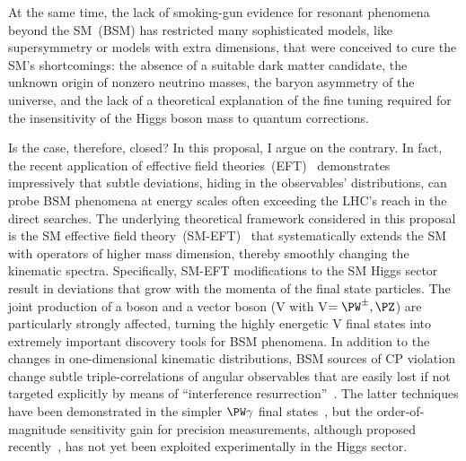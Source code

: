 \documentclass[a4paper,11pt]{article}
\renewcommand{\PV}{{{{V}}}\xspace}
\newcommand{\VH}{{{\PV}{\PH}}\xspace}
\begin{document}
At the same time, the lack of smoking-gun evidence for resonant phenomena beyond the SM~(BSM) has restricted many sophisticated models, like supersymmetry or models with extra dimensions, that were conceived to cure the SM's shortcomings: 
the absence of a suitable dark matter candidate, the unknown origin of nonzero neutrino masses, the baryon asymmetry of the universe, and the lack of a theoretical explanation of the fine tuning required for the insensitivity of the Higgs boson mass to quantum corrections. 

Is the case, therefore, closed? 
In this proposal, I argue on the contrary. 
In fact, the recent application of effective field theories~(EFT)~\cite{Grinstein:1991cd,Chiu:2007dg,Passarino:2016pzb} demonstrates impressively that subtle deviations, hiding in the observables' distributions, can probe BSM phenomena at energy scales often exceeding the LHC's reach in the direct searches. 
The underlying theoretical framework considered in this proposal is the SM effective field theory~(SM-EFT)~\cite{Jenkins:2013zja,Alonso:2013hga,Jenkins:2013wua,Englert:2014cva,Brivio:2017vri} that systematically extends the SM with operators of higher mass dimension,  thereby smoothly changing the kinematic spectra.
Specifically,  SM-EFT modifications to the SM Higgs sector result in deviations that grow with the momenta of the final state particles. 
The joint production of a \PH boson and a vector boson (\VH with \PV$=\PW^{\pm},\PZ$) are particularly strongly affected, turning the highly energetic \VH final states into extremely important discovery tools for BSM phenomena. 
In addition to the changes in one-dimensional kinematic distributions, 
BSM sources of CP violation change subtle triple-correlations of angular observables that are easily lost if not targeted explicitly by means of ``interference resurrection''~\cite{Panico:2017frx}.
The latter techniques have been demonstrated in the simpler $\PW\gamma$ final states~\cite{CMS-PAS-SMP-20-005}, but the order-of-magnitude sensitivity gain for precision measurements, although proposed recently~\cite{Banerjee:2019twi}, has not yet been exploited experimentally in the Higgs sector. 
\end{document}
